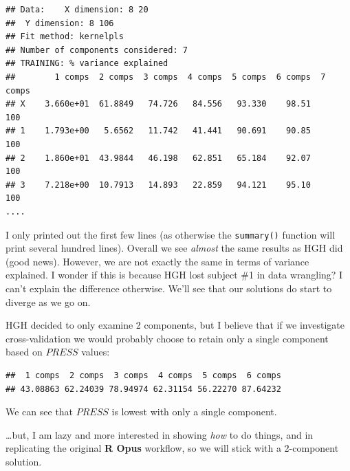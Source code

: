 \documentclass[
]{book}
\newenvironment{Shaded}{\begin{snugshade}}{\end{snugshade}}
\newcommand{\AttributeTok}[1]{\textcolor[rgb]{0.13,0.29,0.53}{#1}}
\newcommand{\CommentTok}[1]{\textcolor[rgb]{0.56,0.35,0.01}{\textit{#1}}}
\newcommand{\ConstantTok}[1]{\textcolor[rgb]{0.56,0.35,0.01}{#1}}
\newcommand{\DecValTok}[1]{\textcolor[rgb]{0.00,0.00,0.81}{#1}}
\newcommand{\FunctionTok}[1]{\textcolor[rgb]{0.13,0.29,0.53}{\textbf{#1}}}
\newcommand{\NormalTok}[1]{#1}
\newcommand{\OtherTok}[1]{\textcolor[rgb]{0.56,0.35,0.01}{#1}}
\newcommand{\SpecialCharTok}[1]{\textcolor[rgb]{0.81,0.36,0.00}{\textbf{#1}}}
\newcommand{\StringTok}[1]{\textcolor[rgb]{0.31,0.60,0.02}{#1}}
\begin{document}
\begin{verbatim}
## Data:    X dimension: 8 20 
##  Y dimension: 8 106
## Fit method: kernelpls
## Number of components considered: 7
## TRAINING: % variance explained
##        1 comps  2 comps  3 comps  4 comps  5 comps  6 comps  7 comps
## X    3.660e+01  61.8849   74.726   84.556   93.330    98.51      100
## 1    1.793e+00   5.6562   11.742   41.441   90.691    90.85      100
## 2    1.860e+01  43.9844   46.198   62.851   65.184    92.07      100
## 3    7.218e+00  10.7913   14.893   22.859   94.121    95.10      100
....
\end{verbatim}

I only printed out the first few lines (as otherwise the \texttt{summary()} function will print several hundred lines). Overall we see \emph{almost} the same results as HGH did (good news). However, we are not exactly the same in terms of variance explained. I wonder if this is because HGH lost subject \#1 in data wrangling? I can't explain the difference otherwise. We'll see that our solutions do start to diverge as we go on.

HGH decided to only examine 2 components, but I believe that if we investigate cross-validation we would probably choose to retain only a single component based on \(PRESS\) values:

\begin{Shaded}
\end{Shaded}

\begin{verbatim}
##  1 comps  2 comps  3 comps  4 comps  5 comps  6 comps 
## 43.08863 62.24039 78.94974 62.31154 56.22270 87.64232
\end{verbatim}

We can see that \(PRESS\) is lowest with only a single component.

\ldots but, I am lazy and more interested in showing \emph{how} to do things, and in replicating the original \textbf{R Opus} workflow, so we will stick with a 2-component solution.
\end{document}
